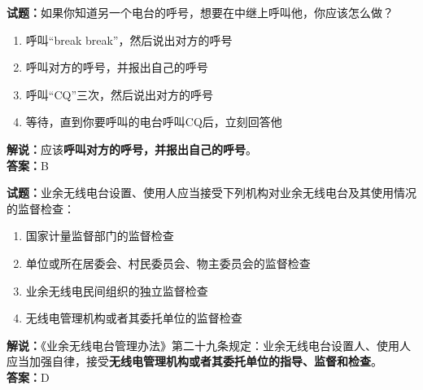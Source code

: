 \documentclass{ctexbook}
\begin{document}
\bigskip


\noindent\textbf{试题：}如果你知道另一个电台的呼号，想要在中继上呼叫他，你应该怎么做？
\begin{enumerate}[leftmargin=3em]
\item 呼叫“break break”，然后说出对方的呼号
\item 呼叫对方的呼号，并报出自己的呼号
\item 呼叫“CQ”三次，然后说出对方的呼号
\item 等待，直到你要呼叫的电台呼叫CQ后，立刻回答他
\end{enumerate}
\noindent\textbf{解说：}应该\textbf{呼叫对方的呼号，并报出自己的呼号}。\\\noindent\textbf{答案：}B


\bigskip


\noindent\textbf{试题：}业余无线电台设置、使用人应当接受下列机构对业余无线电台及其使用情况的监督检查：
\begin{enumerate}[leftmargin=3em]
\item 国家计量监督部门的监督检查
\item 单位或所在居委会、村民委员会、物主委员会的监督检查
\item 业余无线电民间组织的独立监督检查
\item 无线电管理机构或者其委托单位的监督检查
\end{enumerate}
\noindent\textbf{解说：}《业余无线电台管理办法》第二十九条规定：业余无线电台设置人、使用人应当加强自律，接受\textbf{无线电管理机构或者其委托单位的指导、监督和检查}。\\\noindent\textbf{答案：}D



\bigskip
\end{document}
